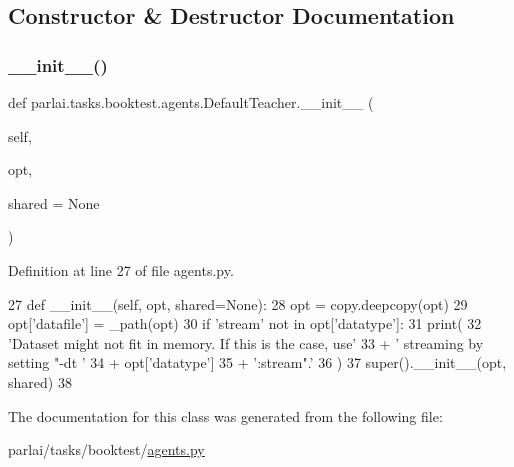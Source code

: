 \subsection{Constructor \& Destructor Documentation}
\mbox{\label{classparlai_1_1tasks_1_1booktest_1_1agents_1_1DefaultTeacher_a22c8ec41b8b29da86546fe666a3016b0}} 
\subsubsection{\texorpdfstring{\+\_\+\+\_\+init\+\_\+\+\_\+()}{\_\_init\_\_()}}
{\footnotesize\ttfamily def parlai.\+tasks.\+booktest.\+agents.\+Default\+Teacher.\+\_\+\+\_\+init\+\_\+\+\_\+ (\begin{DoxyParamCaption}\item[{}]{self,  }\item[{}]{opt,  }\item[{}]{shared = {\ttfamily None} }\end{DoxyParamCaption})}



Definition at line 27 of file agents.\+py.


\begin{DoxyCode}
27     \textcolor{keyword}{def }\_\_init\_\_(self, opt, shared=None):
28         opt = copy.deepcopy(opt)
29         opt[\textcolor{stringliteral}{'datafile'}] = \_path(opt)
30         \textcolor{keywordflow}{if} \textcolor{stringliteral}{'stream'} \textcolor{keywordflow}{not} \textcolor{keywordflow}{in} opt[\textcolor{stringliteral}{'datatype'}]:
31             print(
32                 \textcolor{stringliteral}{'Dataset might not fit in memory. If this is the case, use'}
33                 + \textcolor{stringliteral}{' streaming by setting "-dt '}
34                 + opt[\textcolor{stringliteral}{'datatype'}]
35                 + \textcolor{stringliteral}{':stream".'}
36             )
37         super().\_\_init\_\_(opt, shared)
38 \end{DoxyCode}


The documentation for this class was generated from the following file\+:\begin{DoxyCompactItemize}
\item 
parlai/tasks/booktest/\hyperlink{parlai_2tasks_2booktest_2agents_8py}{agents.\+py}\end{DoxyCompactItemize}
